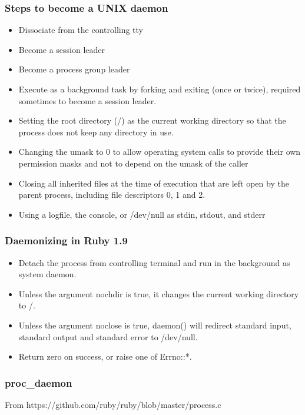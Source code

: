 \documentclass{beamer}
\begin{document}
\begin{frame}
  \frametitle{Steps to become a UNIX daemon}

  \begin{itemize}
    \pause \item Dissociate from the controlling tty
    \pause \item Become a session leader
    \pause \item Become a process group leader
    \pause \item Execute as a background task by forking and exiting (once or twice), required sometimes to become a session leader.
    \pause \item Setting the root directory (/) as the current working directory so that the process does not keep any directory in use.
    \pause \item Changing the umask to 0 to allow operating system calls to provide their own permission masks and not to depend on the umask of the caller
    \pause \item Closing all inherited files at the time of execution that are left open by the parent process, including file descriptors 0, 1 and 2.
    \pause \item Using a logfile, the console, or /dev/null as stdin, stdout, and stderr
  \end{itemize}
\end{frame}

\begin{frame}
  \frametitle{Daemonizing in Ruby 1.9}

  

  \pause
  \begin{itemize}
    \item Detach the process from controlling terminal and run in the background as system daemon.
    \item  Unless the argument nochdir is true, it changes the current working directory to /.
    \item  Unless the argument noclose is true, daemon() will redirect standard input, standard output and standard error to /dev/null.
    \item  Return zero on success, or raise one of Errno::*.
  \end{itemize}
\end{frame}


\begin{frame}
  \frametitle{proc\_daemon}
  From https://github.com/ruby/ruby/blob/master/process.c

  
\end{frame}
\end{document}
